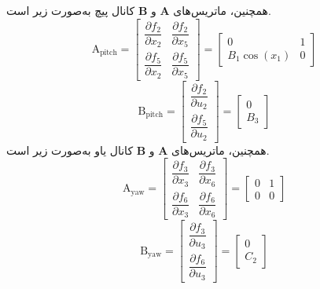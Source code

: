 \documentclass{CCI2020}
\begin{document}
همچنین، ماتریس‌های $\boldsymbol{A}$ و $\boldsymbol{B}$ کانال پیچ به‌صورت زیر است.
\begin{equation}
	\boldsymbol{\mathrm{A}}_{\text{pitch}}  = \begin{bmatrix}
		\dfrac{\partial  f_2}{\partial  x_2}& \dfrac{\partial  f_2}{\partial  x_5}
		\\[1em]
		\dfrac{\partial  f_5}{\partial  x_2}& \dfrac{\partial  f_5}{\partial  x_5}
	\end{bmatrix} = 
	\begin{bmatrix}
		0 & 1\\
		B_1\cos(x_1) & 0
	\end{bmatrix}
\end{equation}
\begin{equation}
	\boldsymbol{\mathrm{B}}_{\text{pitch}}  = \begin{bmatrix}
		\dfrac{\partial  f_2}{\partial  u_2}
		\\[1em]
		\dfrac{\partial  f_5}{\partial  u_2}
	\end{bmatrix} = 
	\begin{bmatrix}
		0\\
		B_3
	\end{bmatrix}
\end{equation}
همچنین، ماتریس‌های $\boldsymbol{A}$ و $\boldsymbol{B}$ کانال یاو به‌صورت زیر است.
\begin{equation}
	\boldsymbol{\mathrm{A}}_{\text{yaw}} = \begin{bmatrix}
		\dfrac{\partial  f_3}{\partial  x_3}& \dfrac{\partial  f_3}{\partial  x_6}
		\\[1em]
		\dfrac{\partial  f_6}{\partial  x_3}& \dfrac{\partial  f_6}{\partial  x_6}
	\end{bmatrix} = 
	\begin{bmatrix}
		0 & 1\\
		0 & 0
	\end{bmatrix}
\end{equation}
\begin{equation}
	\boldsymbol{\mathrm{B}}_{\text{yaw}} = \begin{bmatrix}
		\dfrac{\partial  f_3}{\partial  u_3}
		\\[1em]
		\dfrac{\partial  f_6}{\partial  u_3}
	\end{bmatrix} = 
	\begin{bmatrix}
		0\\
		C_2
	\end{bmatrix}
\end{equation}
\end{document}
